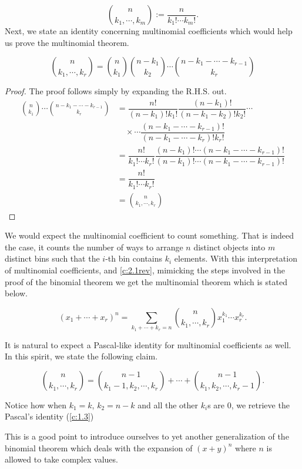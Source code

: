 \[\binom{n}{k_1,\cdots,k_m} := \frac{n}{k_1!\cdots k_m!}.\]
Next, we state an identity concerning multinomial coefficients which would help us prove the multinomial theorem. 
\begin{claim}
\[
\binom{n}{k_{1},\cdots,k_{r}} = \binom{n}{k_{1}}\binom{n-k_{1}}{k_{2}} \cdots \binom{n-k_{1}-\cdots-k_{r-1}}{k_{r}}
\]
\label{c:2.1rev}
\end{claim}
\begin{proof}
The proof follows simply by expanding the R.H.S. out.
\begin{align*}
\binom{n}{k_{1}}\cdots \binom{n-k_{1}-\cdots-k_{r-1}}{k_{r}} &= \dfrac{n!}{(n-k_1)!k_1!}\dfrac{(n-k_1)!}{(n-k_1-k_2)!k_2!} \cdots \\ & \quad \times \cdots \dfrac{(n-k_1-\cdots-k_{r-1})!}{(n-k_1-\cdots-k_{r})!k_r!} \\
&= \dfrac{n!}{k_1!\cdots k_r!}\dfrac{(n-k_1)!\cdots (n-k_1-\cdots-k_{r-1})!}{(n-k_1)!\cdots (n-k_1-\cdots-k_{r-1})!} \\
&=\dfrac{n!}{k_1!\cdots k_r!} \\
&=\binom{n}{k_1,\cdots,k_r}
\end{align*}
\end{proof}
We would expect the multinomial coefficient to count something. That is indeed the case, it counts the number of ways to arrange $n$ distinct objects into $m$ distinct bins such that the $i$-th bin contains $k_i$ elements. With this interpretation of multinomial coefficients, and \cref{c:2.1rev}, mimicking the steps involved in the proof of the binomial theorem we get the multinomial theorem which is stated below. 
\begin{theorem}
	\[
	(x_{1}+\cdots+x_{r})^n = \sum_{k_{1}+\cdots+k_{r}=n}\binom{n}{k_{1},\cdots,k_{r}}x_{1}^{k_{1}}\cdots x_{r}^{k_{r}}
	.\] 
\end{theorem}
It is natural to expect a Pascal-like identity for multinomial coefficients as well. In this spirit, we state the following claim.
\begin{claim}
	\[
		\binom{n}{k_{1},\cdots,k_{r}} = \binom{n-1}{k_1-1,k_2,\cdots,k_r} + \cdots + \binom{n-1}{k_1,k_2,\cdots,k_r-1}
	.\]
\end{claim}
\begin{remark}
Notice how when $k_1=k$, $k_2=n-k$ and all the other $k_i$s are $0$, we retrieve the Pascal's identity (\cref{c:1.3})    
\end{remark}
This is a good point to introduce ourselves to yet another generalization of the binomial theorem which deals with the expansion of $(x+y)^n$ where $n$ is allowed to take complex values. 
